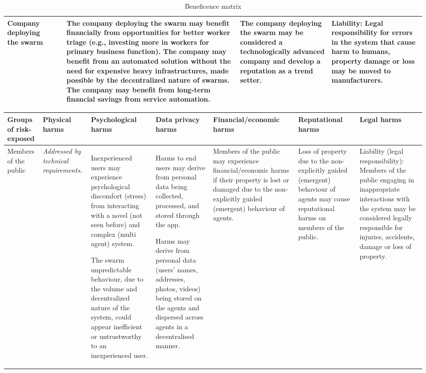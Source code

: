 \documentclass[lettersize,journal]{IEEEtran}
\begin{document}
{\begin{landscape}
\begin{table}[]
\begin{tabular}{|p{0.15\textheight}|p{0.18\textheight}|p{0.18\textheight}|p{0.18\textheight}|p{0.18\textheight}|p{0.18\textheight}|}
Company deploying the swarm &   &  & The company deploying the swarm may benefit financially from opportunities for better worker triage (e.g., investing more in workers for primary business function). The company may benefit from an automated solution without the need for expensive heavy infrastructures, made possible by the decentralized nature of swarms. The company may benefit from long-term financial savings from service automation. & The company deploying the swarm may be considered a technologically advanced company and develop a reputation as a trend setter.& Liability: Legal responsibility for errors in the system that cause harm to humans, property damage or loss may be moved to manufacturers.  \\ \hline
\end{tabular}
\caption{\label{tab:beneficence}Beneficence matrix}
\end{table}

\end{landscape}

\begin{landscape}
\begin{table}[]
\begin{tabular}{|p{0.10\textheight}|p{0.07\textheight}|p{0.20\textheight}|p{0.20\textheight}|p{0.20\textheight}|p{0.20\textheight}|p{0.20\textheight}|}
\hline
Groups of risk-exposed & Physical harms & Psychological harms & Data privacy harms  & Financial/economic harms   & Reputational harms  & Legal harms \\ \hline

Members of the public  & \textit{Addressed by technical requirements.} & Inexperienced users may experience psychological discomfort (stress) from interacting with a novel (not seen before) and complex (multi agent) system. 

The swarm unpredictable behaviour, due to the volume and decentralized nature of the system, could appear inefficient or untrustworthy to an inexperienced user. & Harms to end users may derive from personal data being collected, processed, and stored through the app. 

Harms may derive from personal data (users’ names, addresses, photos, videos) being stored on the agents and dispersed across agents in a decentralised manner. & Members of the public may experience financial/economic harms if their property is lost or damaged due to the non-explicitly guided (emergent) behaviour of agents. & Loss of property due to the non-explicitly guided (emergent) behaviour of agents may cause reputational harms on members of the public. & Liability (legal responsibility): Members of the public engaging in inappropriate interactions with the system may be considered legally responsible for injuries, accidents, damage or loss of property. \\ \hline


\end{tabular}
\end{table}
\end{landscape}}
\end{document}
